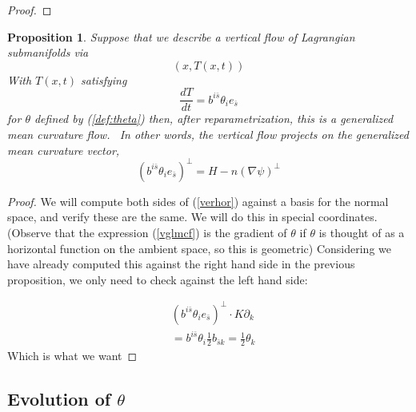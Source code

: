 \documentclass[12pt,letterpaper]{amsart}%
\newcounter{mycounter}
\numberwithin{mycounter}{section}
\theoremstyle{plain}
\newtheorem{proposition}[mycounter]{Proposition}
\numberwithin{equation}{section}
\theoremstyle{definition}
\begin{document}
\begin{proof}
\end{proof}


\begin{proposition}
Suppose that we describe a vertical flow of Lagrangian submanifolds via
\[
\left(  x,T(x,t)\right)
\]
With $T(x,t)$ satisfying
\begin{equation}
\frac{dT}{dt}=b^{i\bar{s}}\theta_{i}e_{\bar{s}} \label{vglmcf} 
\end{equation} for $\theta$ defined by (\ref{def:theta})
then, after reparametrization, this is a generalized mean curvature flow. \ In
other words, the vertical flow projects on the generalized mean curvature vector,
\begin{equation}
\left(  b^{i\bar{s}}\theta_{i}e_{\bar{s}}\right)  ^{\perp}=H-n\left(
\nabla\psi\right)  ^{\perp} \label{verhor}%
\end{equation}

\end{proposition}

\begin{proof}
We will compute both sides of (\ref{verhor}) against a basis for the normal
space, and verify these are the same. We will do this in special coordinates. (Observe that the expression (\ref{vglmcf}) is the gradient of $\theta$ if $\theta$ is thought of as a horizontal function on the ambient space, so this is geometric)  Considering we have already computed this against the right hand side in the previous proposition, we only need to check against the left hand side:

\begin{align*}
& \left(  b^{i\bar{s}}\theta_{i}e_{\bar{s}}\right)  ^{\perp}\cdot
K\partial_{k}\\
& =b^{i\bar{s}}\theta_{i}\frac{1}{2}b_{\bar{s}k}=\frac{1}{2}\theta_{k}%
\end{align*}
Which is what we want
\end{proof}


\subsection{Evolution of $\theta$}
\end{document}
